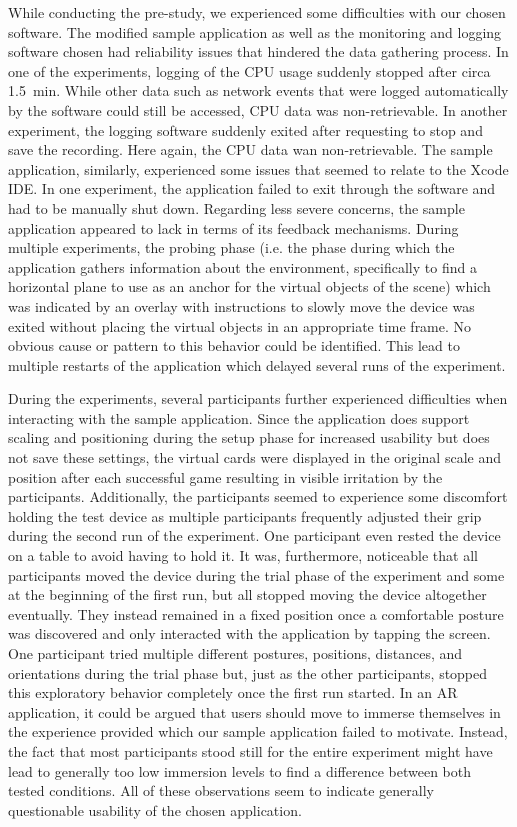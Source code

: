 \documentclass[12pt,twoside,english]{article}
\begin{document}
While conducting the pre-study, we experienced some difficulties with our chosen software.
The modified sample application as well as the monitoring and logging software chosen had reliability issues that hindered the data gathering process.
In one of the experiments, logging of the \gls{CPU} usage suddenly stopped after circa 1.5~min.
While other data such as network events that were logged automatically by the software could still be accessed, \gls{CPU} data was non-retrievable.
In another experiment, the logging software suddenly exited after requesting to stop and save the recording.
Here again, the \gls{CPU} data wan non-retrievable.
The sample application, similarly, experienced some issues that seemed to relate to the Xcode \gls{IDE}.
In one experiment, the application failed to exit through the software and had to be manually shut down.
Regarding less severe concerns, the sample application appeared to lack in terms of its feedback mechanisms.
During multiple experiments, the probing phase (i.e. the phase during which the application gathers information about the environment, specifically to find a horizontal plane to use as an anchor for the virtual objects of the scene) which was indicated by an overlay with instructions to slowly move the device was exited without placing the virtual objects in an appropriate time frame.
No obvious cause or pattern to this behavior could be identified.
This lead to multiple restarts of the application which delayed several runs of the experiment.

During the experiments, several participants further experienced difficulties when interacting with the sample application.
Since the application does support scaling and positioning during the setup phase for increased usability but does not save these settings, the virtual cards were displayed in the original scale and position after each successful game resulting in visible irritation by the participants.
Additionally, the participants seemed to experience some discomfort holding the test device as multiple participants frequently adjusted their grip during the second run of the experiment.
One participant even rested the device on a table to avoid having to hold it.
It was, furthermore, noticeable that all participants moved the device during the trial phase of the experiment and some at the beginning of the first run, but all stopped moving the device altogether eventually.
They instead remained in a fixed position once a comfortable posture was discovered and only interacted with the application by tapping the screen.
One participant tried multiple different postures, positions, distances, and orientations during the trial phase but, just as the other participants, stopped this exploratory behavior completely once the first run started.
In an \gls{AR} application, it could be argued that users should move to immerse themselves in the experience provided which our sample application failed to motivate.
Instead, the fact that most participants stood still for the entire experiment might have lead to generally too low immersion levels to find a difference between both tested conditions.
All of these observations seem to indicate generally questionable usability of the chosen application.
\end{document}

